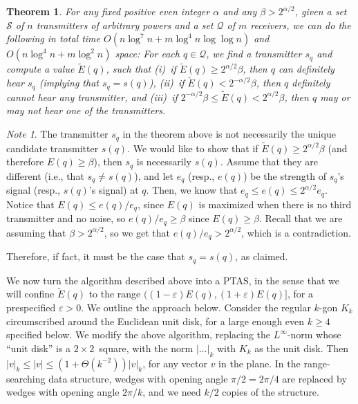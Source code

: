\documentclass[11pt]{article}
\newtheorem{theorem}{Theorem}[section]
\theoremstyle{remark}
\newtheorem*{note}{Note}
\def\Q{\mathcal{Q}}
\def\S{\mathcal{S}}
\def\EE{\tilde{E}}
\let\eps\varepsilon
\begin{document}
\begin{theorem}
  \label{th:2d-general}
  For any fixed positive even integer $\alpha$ and any $\beta>2^{\alpha/2}$, given a set $\S$ of $n$
  transmitters of arbitrary powers and a set $\Q$ of $m$ receivers, we can do the following in 
  total time $O(n \log^7 n + m \log^4 n \log \log n)$ and $O(n \log^4 n + m \log^2 n)$ space: For each $q \in \Q$, we find 
  a transmitter $s_q$ and compute a value $\EE(q)$, such that (i)~if $\EE(q) \ge 2^{\alpha/2}\beta$,
  then $q$ can definitely hear $s_q$ (implying that $s_q=s(q)$), (ii)~if $\EE(q) < 2^{-\alpha/2}\beta$, then $q$ definitely cannot hear any transmitter, and 
  (iii)~if $2^{-\alpha/2}\beta \le \EE(q) < 2^{\alpha/2}\beta$, then $q$ may or may not hear one of the transmitters.
\end{theorem}

\begin{note}
  The transmitter $s_q$ in the theorem above is not necessarily the unique candidate transmitter $s(q)$. We would like to show that if $\EE(q) \ge 2^{\alpha/2}\beta$ (and therefore $E(q) \ge \beta$), then $s_q$ is necessarily $s(q)$. Assume that they are different (i.e., that $s_q \ne s(q)$), and let $e_q$ (resp., $e(q)$) be the strength of $s_q$'s signal (resp., $s(q)$'s signal) at $q$. Then, we know that $e_q \leq e(q) \leq 2^{\alpha/2} e_q$. Notice that $E(q) \le e(q)/e_q$, since $E(q)$ is maximized when there is no third transmitter and no noise, so $e(q)/e_q \ge \beta$ since $E(q) \ge \beta$. Recall that we are assuming that $\beta > 2^{\alpha/2}$, so we get that $e(q)/e_q > 2^{\alpha/2}$, which is a contradiction. 

  Therefore, if fact, it must be the case that $s_q=s(q)$, as claimed.
\end{note}

We now turn the algorithm described above into a PTAS, in the sense that we will confine $\EE(q)$ to the range $((1-\eps)E(q),(1+\eps)E(q)]$,
for a prespecified $\eps>0$.  We outline the approach below.
Consider the regular $k$-gon $K_k$ circumscribed around the Euclidean unit disk, for a large enough even $k\geq 4$ specified below.  We modify the above algorithm, replacing the $L^\infty$-norm whose ``unit disk'' is a $2\times2$~square, with the norm $|\dots|_k$ with $K_k$ as the unit disk. Then 
$|v|_k \leq |v| \leq (1+\Theta(k^{-2}))|v|_k$, for any vector $v$ in the plane.  In the range-searching data structure, wedges with opening angle $\pi/2=2\pi/4$ are replaced by wedges with opening angle $2\pi/k$, and we need $k/2$ copies of the structure.
\end{document}
